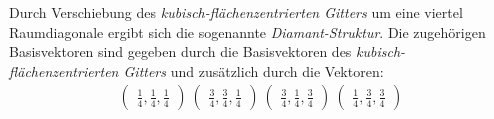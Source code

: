 Durch Verschiebung des \textit{kubisch-flächenzentrierten Gitters}
um eine viertel Raumdiagonale ergibt sich die sogenannte
\textit{Diamant-Struktur}.
Die zugehörigen Basisvektoren sind gegeben durch die
Basisvektoren des \textit{kubisch-flächenzentrierten Gitters}
und zusätzlich durch die Vektoren:
\begin{align}
   \label{eqn:4*}
   \begin{pmatrix}
    \frac{1}{4}, \frac{1}{4}, \frac{1}{4}
  \end{pmatrix}\
  \begin{pmatrix}
    \frac{3}{4}, \frac{3}{4}, \frac{1}{4}
  \end{pmatrix}\
  \begin{pmatrix}
    \frac{3}{4}, \frac{1}{4}, \frac{3}{4}
  \end{pmatrix}\
  \begin{pmatrix}
    \frac{1}{4}, \frac{3}{4}, \frac{3}{4}
  \end{pmatrix}
\end{align}

